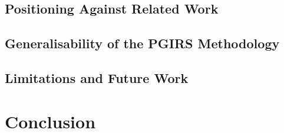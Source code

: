 \documentclass[twocolumn]{article}
\begin{document}
\subsection{Positioning Against Related Work}

\subsection{Generalisability of the PGIRS Methodology}

\subsection{Limitations and Future Work}

\section{Conclusion}

%


\end{document}

